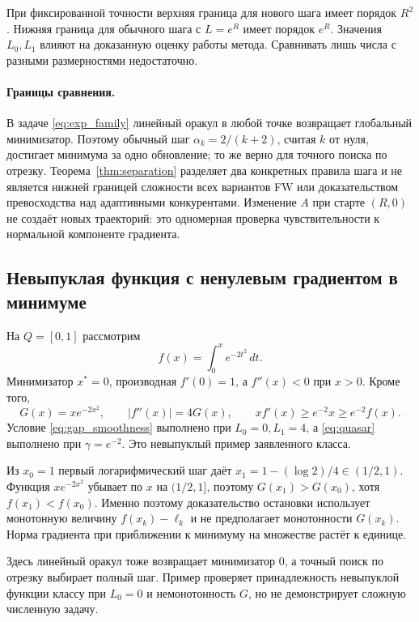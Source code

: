 При фиксированной точности верхняя граница для нового шага
имеет порядок $R^2$. Нижняя граница для обычного шага с $L=e^R$
имеет порядок $e^R$. Значения $L_0,L_1$ влияют на доказанную
оценку работы метода. Сравнивать лишь числа с разными
размерностями недостаточно.

\paragraph{Границы сравнения.}
В задаче \eqref{eq:exp_family} линейный оракул в любой точке возвращает
глобальный минимизатор. Поэтому обычный шаг $\alpha_k=2/(k+2)$,
считая $k$ от нуля, достигает минимума за одно обновление; то же
верно для точного поиска по отрезку. Теорема~\ref{thm:separation}
разделяет два конкретных правила шага и не является нижней границей
сложности всех вариантов FW или доказательством превосходства над
адаптивными конкурентами. Изменение $A$ при старте $(R,0)$ не создаёт
новых траекторий: это одномерная проверка чувствительности к нормальной
компоненте градиента.

\subsection{Невыпуклая функция с ненулевым градиентом в минимуме}
На $Q=[0,1]$ рассмотрим
\begin{equation}\label{eq:nonconvex}
 f(x)=\int_0^x e^{-2t^2}\,dt.
\end{equation}
Минимизатор $x^*=0$, производная $f'(0)=1$, а $f''(x)<0$ при $x>0$.
Кроме того,
\[
 G(x)=xe^{-2x^2},\qquad
 |f''(x)|=4G(x),\qquad
 xf'(x)\ge e^{-2}x\ge e^{-2}f(x).
\]
Условие \eqref{eq:gap_smoothness} выполнено при $L_0=0,L_1=4$,
а \eqref{eq:quasar} выполнено при $\gamma=e^{-2}$.
Это невыпуклый пример заявленного класса.

Из $x_0=1$ первый логарифмический шаг даёт
$x_1=1-(\log2)/4\in(1/2,1)$.
Функция $xe^{-2x^2}$ убывает по $x$ на $(1/2,1]$,
поэтому $G(x_1)>G(x_0)$, хотя $f(x_1)<f(x_0)$.
Именно поэтому доказательство остановки использует монотонную
величину $f(x_k)-\ell_k$ и не предполагает монотонности $G(x_k)$.
Норма градиента при приближении к минимуму на множестве растёт
к единице.

Здесь линейный оракул тоже возвращает минимизатор $0$, а точный
поиск по отрезку выбирает полный шаг. Пример проверяет принадлежность
невыпуклой функции классу при $L_0=0$ и немонотонность $G$,
но не демонстрирует сложную численную задачу.
